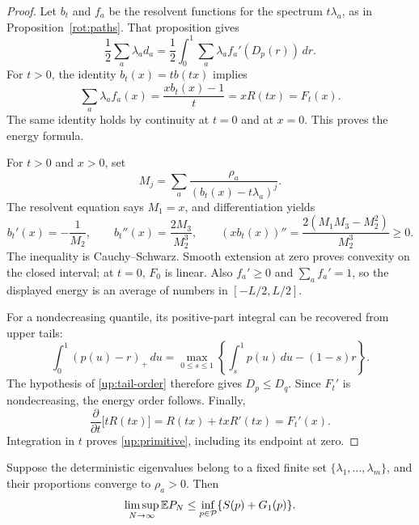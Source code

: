 \begin{proof}
Let \(b_t\) and \(f_a\) be the resolvent functions for the spectrum
\(t\lambda_a\), as in Proposition~\ref{rot:paths}. That proposition
gives
\[
 \frac12\sum_a\lambda_a d_a
 =\frac12\int_0^1\sum_a\lambda_a f_a'(D_p(r))\,dr.
\]
For \(t>0\), the identity \(b_t(x)=t b(tx)\) implies
\[
 \sum_a\lambda_a f_a(x)
 =\frac{x b_t(x)-1}{t}=xR(tx)=F_t(x).
\]
The same identity holds by continuity at \(t=0\) and at \(x=0\).
This proves the energy formula.

For \(t>0\) and \(x>0\), set
\[
 M_j=\sum_a\frac{\rho_a}{(b_t(x)-t\lambda_a)^j}.
\]
The resolvent equation says \(M_1=x\), and differentiation yields
\[
 b_t'(x)=-\frac1{M_2},\qquad
 b_t''(x)=\frac{2M_3}{M_2^3},\qquad
 (x b_t(x))''=\frac{2(M_1M_3-M_2^2)}{M_2^3}\ge0.
\]
The inequality is Cauchy--Schwarz. Smooth extension at zero proves
convexity on the closed interval; at \(t=0\), \(F_0\) is linear.
Also \(f_a'\ge0\) and \(\sum_a f_a'=1\), so the displayed energy
is an average of numbers in \([-L/2,L/2]\).

For a nondecreasing quantile, its positive-part integral can be
recovered from upper tails:
\[
 \int_0^1(p(u)-r)_+\,du
 =\max_{0\le s\le1}
   \left\{\int_s^1p(u)\,du-(1-s)r\right\}.
\]
The hypothesis of \eqref{up:tail-order} therefore gives
\(D_p\le D_q\). Since \(F_t'\) is nondecreasing, the energy order
follows. Finally,
\[
 \frac{\partial}{\partial t}\bigl[tR(tx)\bigr]
 =R(tx)+txR'(tx)=F_t'(x).
\]
Integration in \(t\) proves \eqref{up:primitive}, including its
endpoint at zero.
\end{proof}

\begin{proposition}\label{up:bound}
Suppose the deterministic eigenvalues belong to a fixed finite set
\(\{\lambda_1,\ldots,\lambda_m\}\), and their proportions converge
to \(\rho_a>0\). Then
\[
 \limsup_{N\to\infty}\mathbb E P_N
 \le\inf_{p\in\mathcal P}\{S(p)+G_1(p)\}.
\]
\end{proposition}

